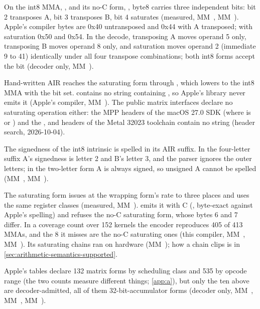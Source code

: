On the int8 MMA, , and its no-C form, , byte8 carries
three independent bits: bit 2 transposes A, bit 3 transposes B, bit 4 saturates (measured, MM~,
MM~). Apple's compiler bytes are 0x40 untransposed and 0x44 with A transposed; with saturation 0x50 and 0x54. In
the decode, transposing A moves operand 5 only, transposing B moves operand 8 only, and saturation moves operand 2
(immediate 9 to 41) identically under all four transpose combinations; both int8 forms accept the bit (decoder only,
MM~).

Hand-written AIR reaches the saturating form through , which lowers
to the int8 MMA with the bit set.  contains no string containing , so Apple's
library never emits it (Apple's compiler, MM~). The public matrix interfaces declare no saturating operation
either: the MPP headers of the macOS 27.0 SDK (where  is  or
) and the ,  and
 headers of the Metal 32023 toolchain contain no string  (header search,
2026-10-04).

The signedness of the int8 intrinsic is spelled in its AIR suffix. In the four-letter suffix A's signedness is letter
2 and B's letter 3, and the parser ignores the outer letters; in the two-letter form A is always signed, so unsigned A
cannot be spelled (MM~, MM~).

The saturating form issues at the wrapping form's rate to three places and uses the same register classes
(measured, MM~).  emits it with C (, byte-exact
against Apple's  spelling) and refuses the no-C saturating form, whose bytes 6 and 7 differ. In a
coverage count over 152 kernels the encoder reproduces 405 of 413 MMAs, and the 8 it misses are the no-C saturating
ones (this compiler, MM~, MM~). Its saturating chains ran on hardware (MM~); how a chain
clips is in \cref{sec:arithmetic-semantics-supported}.

Apple's tables declare 132 matrix forms by scheduling class and 535 by opcode range (the two counts measure
different things; \cref{app:a}), but only the ten above are decoder-admitted, all of them 32-bit-accumulator forms
(decoder only, MM~, MM~, MM~).

